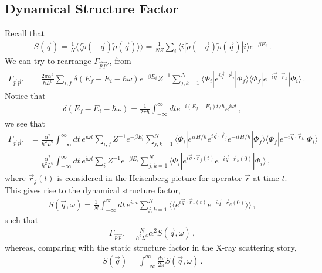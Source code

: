 \documentclass[11pt, oneside]{book}
\theoremstyle{break}
\theoremstyle{break}
\newcommand{\that}[1]{\widetilde{#1}}
\begin{document}
\subsection{Dynamical Structure Factor}
Recall that 
\begin{align*}
S(\vec{q}) = \frac{1}{N}\langle\langle \that{\rho}(-\vec{q})\that{\rho}(\vec{q})\rangle\rangle = \frac{1}{NZ}\sum_i\langle i|\that{\rho}(-\vec{q})\that{\rho}(\vec{q})|i\rangle e^{-\beta E_i}\,.
\end{align*}
We can try to rearrange $\Gamma_{\vec{p}\vec{p}'}$, from
\begin{align*}
\Gamma_{\vec{p}\vec{p}'} 
&= \frac{2\pi \alpha^2}{\hbar L^6} \sum_{i,f}\delta(E_f - E_i - \hbar \omega)  e^{-\beta E_i}Z^{-1} \sum_{j,k=1}^N \langle \Phi_i | e^{i\vec{q}\cdot \vec{r}_j}|\Phi_f\rangle \langle \Phi_f | e^{-i\vec{q}\cdot \vec{r}_k}|\Phi_i\rangle\,.
\end{align*}
Notice that 
\begin{align*}
\delta(E_f - E_i - \hbar \omega) = \frac{1}{2\pi \hbar} \int_{-\infty}^\infty dt e^{-i (E_f - E_i)t/\hbar}e^{i\omega t}\,,
\end{align*}
we see that 
\begin{align*}
\Gamma_{\vec{p}\vec{p}'} 
&= \frac{\alpha^2}{\hbar^2L^6} \int_{-\infty}^\infty dt\, e^{i\omega t}\sum_{i,f} Z^{-1}e^{-\beta E_i} \sum_{j,k=1}^N \langle \Phi_i | e^{itH/\hbar}e^{i\vec{q}\cdot \vec{r}_j} e^{-itH/\hbar} | \Phi_f\rangle \langle \Phi_f | e^{-i \vec{q}\cdot \vec{r}_k}|\Phi_i\rangle\\
&= \frac{\alpha^2}{\hbar^2 L^6} \int_{-\infty}^\infty dt\, e^{i\omega t}\sum_{i} Z^{-1}e^{-\beta E_i}\sum_{j,k=1}^N\langle \Phi_i | e^{i\vec{q}\cdot \vec{r}_j(t)} e^{-i\vec{q}\cdot \vec{r}_k(0)}|\Phi_i\rangle\,,
\end{align*}
where $\vec{r}_j(t)$ is considered in the Heisenberg picture for operator $\vec{r}$ at time $t$.
This gives rise to the dynamical structure factor,
\begin{align*}
S(\vec{q},\omega) = \frac{1}{N}\int_{-\infty}^\infty dt\, e^{i\omega t} \sum_{j,k=1}^N \langle\langle 
e^{i\vec{q}\cdot \vec{r}_j(t)} e^{-i\vec{q}\cdot \vec{r}_k(0)}
\rangle\rangle\,,
\end{align*}
such that 
\begin{align*}
\Gamma_{\vec{p}\vec{p}'} = \frac{N}{\hbar^2 L^6} \alpha^2S(\vec{q},\omega)\,,
\end{align*}
whereas, comparing with the static structure factor in the X-ray scattering story, 
\begin{align*}
S(\vec{q}) = \int_{-\infty}^\infty \frac{d\omega}{2\pi}S(\vec{q},\omega)\,.
\end{align*}
\end{document}
